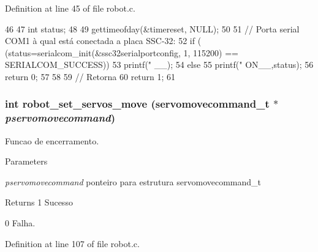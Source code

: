 Definition at line 45 of file robot.c.


\begin{DoxyCode}
46 {
47         int status;
48         
49         gettimeofday(&timereset, NULL);
50  
51         // Porta serial COM1 à qual está conectada a placa SSC-32:
52         if ( (status=serialcom_init(&ssc32serialportconfig, 1, 115200) ==  
      SERIALCOM_SUCCESS)){
53                 printf("\n %
      __);
54         } else {
55                 printf("\n %
      ON__,status);
56                 return 0;
57         }
58 
59         // Retorna 
60         return 1; 
61 }                      
\end{DoxyCode}
\subsubsection[{robot\_\-set\_\-servos\_\-move}]{\setlength{\rightskip}{0pt plus 5cm}int robot\_\-set\_\-servos\_\-move (servomovecommand\_\-t $\ast$ {\em pservomovecommand})}\label{robot_8h_a02336172601fb85bfae39447808cce13}


Funcao de encerramento. 
\begin{DoxyParams}{Parameters}
\item[{\em pservomovecommand}]ponteiro para estrutura servomovecommand\_\-t \end{DoxyParams}
\begin{DoxyReturn}{Returns}
1 Sucesso 

0 Falha. 
\end{DoxyReturn}


Definition at line 107 of file robot.c.


